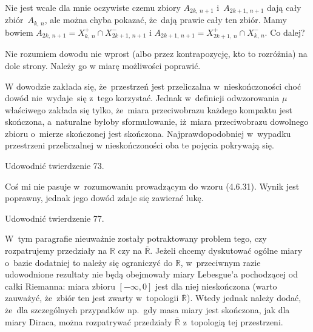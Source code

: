 \documentclass[a4paper,11pt]{article}
\begin{document}
\start {} Nie jest wcale dla mnie oczywiste czemu zbiory
$A_{ 2 k,\, n+ 1 }$ i~$A_{ 2 k + 1,\, n+ 1 }$ dają cały
zbiór~$A_{ k,\, n }$, ale można chyba pokazać, że~dają prawie cały ten
zbiór. Mamy bowiem
$A_{ 2 k,\, n + 1 } = X^{ + }_{ k,\, n } \cap X^{ - }_{ 2 k + 1,\, n +
  1 }$ i
$A_{ 2 k + 1,\, n + 1 } = X^{ + }_{ 2 k + 1,\, n } \cap X^{ - }_{ k,\,
  n }$. Co dalej?

\vspace{\spaceFour}


\start {} Nie rozumiem dowodu nie wprost (albo przez
kontrapozycję, kto to rozróżnia) na dole strony. Należy go w miarę
możliwości poprawić.

\vspace{\spaceFour}


\start {} W dowodzie zakłada się, że~przestrzeń jest
przeliczalna w~nieskończoności choć dowód nie~wydaje~się z~tego
korzystać. Jednak w~definicji odwzorowania $\mu$\dywiz właściwego
zakłada się tylko, że~miara przeciwobrazu każdego kompaktu jest
skończona, a~naturalne byłoby sformułowanie, iż~miara przeciwobrazu
dowolnego zbioru o~mierze skończonej jest skończona.
Najprawdopodobniej w~wypadku przestrzeni przeliczalnej w
nieskończoności oba te pojęcia pokrywają się.

\vspace{\spaceFour}


\start {} Udowodnić twierdzenie 73.

\vspace{\spaceFour}


\start {} Coś mi nie pasuje w~rozumowaniu prowadzącym do wzoru
(4.6.31). Wynik jest poprawny, jednak jego dowód zdaje się zawierać
lukę.

\vspace{\spaceFour}


\start {} Udowodnić twierdzenie 77.

\vspace{\spaceFour}


\start {} W~tym paragrafie nieuważnie zostały potraktowany
problem tego, czy rozpatrujemy przedziały na $\mathbb{R}$ czy na
$\overline{\mathbb{R}}$. Jeżeli chcemy dyskutować ogólne miary o~bazie
dodatniej to należy się ograniczyć do $\mathbb{R}$, w~przeciwnym razie
udowodnione rezultaty nie będą obejmowały miary Lebesgue'a pochodzącej
od całki Riemanna: miara zbioru $[-\infty, 0]$ jest dla niej
nieskończona (warto zauważyć, że~zbiór ten jest zwarty w~topologii
$\overline{\mathbb{R}}$). Wtedy jednak należy dodać, że~dla
szczególnych przypadków np.~gdy masa miary jest skończona, jak dla
miary Diraca, można rozpatrywać przedziały $\overline{\mathbb{R}}$
z~topologią tej przestrzeni.
\end{document}
